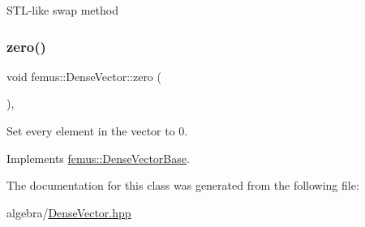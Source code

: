 \begin{DoxyItemize}
\item S\+T\+L-\/like swap method 
\end{DoxyItemize}\mbox{\label{classfemus_1_1_dense_vector_ae2eafd9df7f6ae8fe75165a3eb675a4b}} 
\subsubsection{\texorpdfstring{zero()}{zero()}}
{\footnotesize\ttfamily void femus\+::\+Dense\+Vector\+::zero (\begin{DoxyParamCaption}{ }\end{DoxyParamCaption})\hspace{0.3cm}{\ttfamily [inline]}, {\ttfamily [virtual]}}



Set every element in the vector to 0. 



Implements \mbox{\hyperlink{classfemus_1_1_dense_vector_base_abd1b93469867212f796c7b86d242c550}{femus\+::\+Dense\+Vector\+Base}}.



The documentation for this class was generated from the following file\+:\begin{DoxyCompactItemize}
\item 
algebra/\mbox{\hyperlink{_dense_vector_8hpp}{Dense\+Vector.\+hpp}}\end{DoxyCompactItemize}
